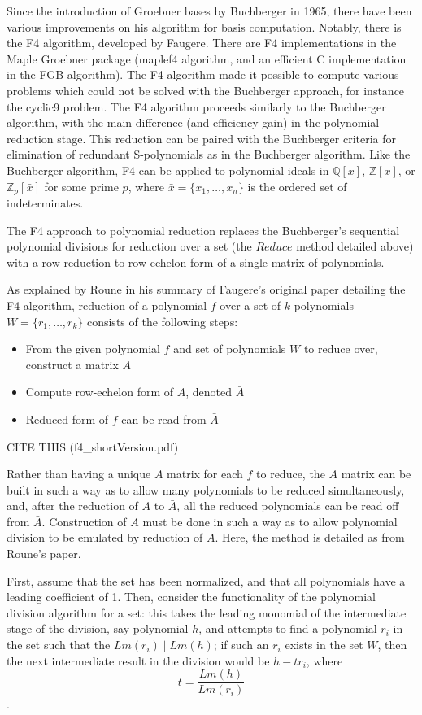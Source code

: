 \documentclass[letterpaper,12pt,titlepage,oneside,final]{book}
\begin{document}
Since the introduction of Groebner bases by Buchberger in 1965, there have been various improvements on his algorithm for basis computation.  Notably, there is the F4 algorithm, developed by Faugere.  There are F4 implementations in the Maple Groebner package (maplef4 algorithm, and an efficient C implementation in the FGB algorithm).  The F4 algorithm made it possible to compute various problems which could not be solved with the Buchberger approach, for instance the cyclic9 problem.  The F4 algorithm proceeds similarly to the Buchberger algorithm, with the main difference (and efficiency gain) in the polynomial reduction stage.  This reduction can be paired with the Buchberger criteria for elimination of redundant S-polynomials as in the Buchberger algorithm.  Like the Buchberger algorithm, F4 can be applied to polynomial ideals in ${\mathbb{Q}[\bar x]}$, ${\mathbb{Z}[\bar x]}$, or ${\mathbb{Z}_p[\bar x]}$ for some prime ${p}$, where ${\bar x = \{x_1, \ldots, x_n\}}$ is the ordered set of indeterminates.   

The F4 approach to polynomial reduction replaces the Buchberger's sequential polynomial divisions for reduction over a set (the ${Reduce}$ method detailed above) with a row reduction to row-echelon form of a single matrix of polynomials.

As explained by Roune in his summary of Faugere's original paper detailing the F4 algorithm, reduction of a polynomial ${f}$ over a set of ${k}$ polynomials ${W = \{r_1, \ldots, r_k\}}$ consists of the following steps:
\begin{itemize}
  \item From the given polynomial ${f}$ and set of polynomials ${W}$ to reduce over, construct a matrix ${A}$
  \item Compute row-echelon form of ${A}$, denoted ${\bar A}$
  \item Reduced form of ${f}$ can be read from ${\bar A}$
\end{itemize}      
CITE THIS (f4\_shortVersion.pdf)

Rather than having a unique ${A}$ matrix for each ${f}$ to reduce, the ${A}$ matrix can be built in such a way as to allow many polynomials to be reduced simultaneously, and, after the reduction of ${A}$ to ${\bar A}$, all the reduced polynomials can be read off from ${\bar A}$.  Construction of ${A}$ must be done in such a way as to allow polynomial division to be emulated by reduction of ${A}$.  Here, the method is detailed as from Roune's paper.

First, assume that the set has been normalized, and that all polynomials have a leading coefficient of 1.  Then, consider the functionality of the polynomial division algorithm for a set: this takes the leading monomial of the intermediate stage of the division, say polynomial ${h}$, and attempts to find a polynomial ${r_i}$ in the set such that the ${Lm(r_i) \mid Lm(h)}$; if such an ${r_i}$ exists in the set ${W}$, then the next intermediate result in the division would be ${h - tr_i}$, where $${t = \frac{Lm(h)}{Lm(r_i)}}$$.  
\end{document}
